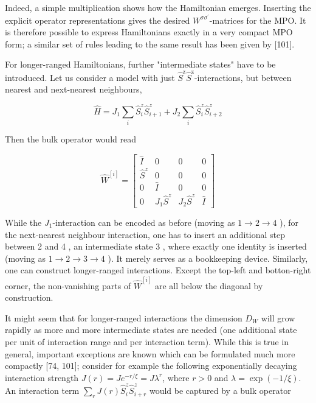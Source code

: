 \documentclass[12pt]{article}
\begin{document}
Indeed, a simple multiplication shows how the Hamiltonian emerges. Inserting the explicit operator representations gives the desired $W^{\sigma \sigma^{\prime}}$-matrices for the MPO. It is therefore possible to express Hamiltonians exactly in a very compact MPO form; a similar set of rules leading to the same result has been given by [101].

For longer-ranged Hamiltonians, further "intermediate states" have to be introduced. Let us consider a model with just $\hat{S}^{\mathrm{z}} \hat{S}^{\mathrm{z}}$-interactions, but between nearest and next-nearest neighbours,


\begin{equation*}
\hat{H}=J_{1} \sum_{i} \hat{S}_{i}^{z} \hat{S}_{i+1}^{z}+J_{2} \sum_{i} \hat{S}_{i}^{z} \hat{S}_{i+2}^{z} \tag{186}
\end{equation*}


Then the bulk operator would read

\[
\hat{W}^{[i]}=\left[\begin{array}{cccc}
\hat{I} & 0 & 0 & 0  \tag{187}\\
\hat{S}^{z} & 0 & 0 & 0 \\
0 & \hat{I} & 0 & 0 \\
0 & J_{1} \hat{S}^{z} & J_{2} \hat{S}^{z} & \hat{I}
\end{array}\right]
\]

While the $J_{1}$-interaction can be encoded as before (moving as $1 \rightarrow 2 \rightarrow 4$ ), for the next-nearest neighbour interaction, one has to insert an additional step between 2 and 4 , an intermediate state 3 , where exactly one identity is inserted (moving as $1 \rightarrow 2 \rightarrow 3 \rightarrow 4$ ). It merely serves as a bookkeeping device. Similarly, one can construct longer-ranged interactions. Except the top-left and botton-right corner, the non-vanishing parts of $\hat{W}^{[i]}$ are all below the diagonal by construction.

It might seem that for longer-ranged interactions the dimension $D_{W}$ will grow rapidly as more and more intermediate states are needed (one additional state per unit of interaction range and per interaction term). While this is true in general, important exceptions are known which can be formulated much more compactly [74, 101]; consider for example the following exponentially decaying interaction strength $J(r)=J e^{-r / \xi}=J \lambda^{r}$, where $r>0$ and $\lambda=\exp (-1 / \xi)$. An interaction term $\sum_{r} J(r) \hat{S}_{i}^{z} \hat{S}_{i+r}^{z}$ would be captured by a bulk operator
\end{document}
